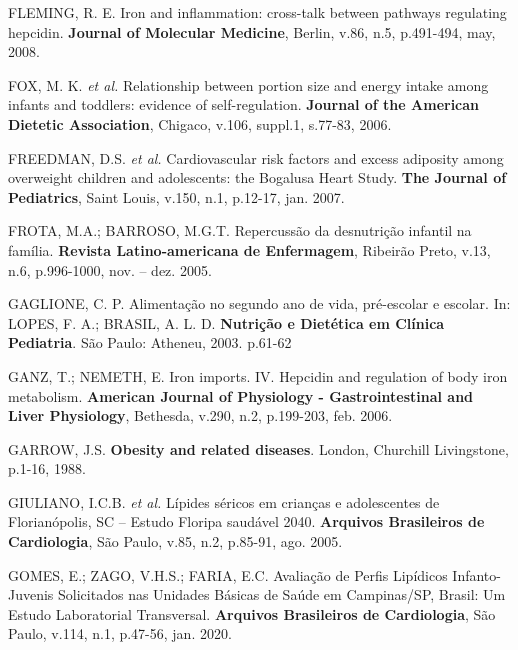 \bigbreak

\noindent FLEMING, R. E. Iron and inflammation: cross-talk between pathways regulating hepcidin. \textbf{Journal of Molecular Medicine}, Berlin, v.86, n.5, p.491-494, may, 2008.

\bigbreak

\noindent FOX, M. K. \textit{et al.} Relationship between portion size and energy intake among infants and toddlers: evidence of self-regulation. \textbf{Journal of the American Dietetic Association}, Chigaco, v.106, suppl.1, s.77-83, 2006.

\bigbreak

\noindent FREEDMAN, D.S. \textit{et al.} Cardiovascular risk factors and excess adiposity among overweight children and adolescents: the Bogalusa Heart Study. \textbf{The Journal of Pediatrics}, Saint Louis, v.150, n.1, p.12-17, jan. 2007.

\bigbreak

\noindent FROTA, M.A.; BARROSO, M.G.T. Repercussão da desnutrição infantil na família. \textbf{Revista Latino-americana de Enfermagem}, Ribeirão Preto, v.13, n.6, p.996-1000, nov. – dez. 2005.

\bigbreak

\noindent GAGLIONE, C. P. Alimentação no segundo ano de vida, pré-escolar e escolar. In: LOPES, F. A.; BRASIL, A. L. D. \textbf{Nutrição e Dietética em Clínica Pediatria}. São Paulo: Atheneu, 2003. p.61-62 

\bigbreak

\noindent GANZ, T.; NEMETH, E. Iron imports. IV. Hepcidin and regulation of body iron metabolism. \textbf{American Journal of Physiology - Gastrointestinal and Liver Physiology}, Bethesda, v.290, n.2, p.199-203, feb. 2006.

\bigbreak

\noindent GARROW, J.S. \textbf{Obesity and related diseases}. London, Churchill Livingstone, p.1-16, 1988. 

\bigbreak

\noindent GIULIANO, I.C.B. \textit{et al.} Lípides séricos em crianças e adolescentes de Florianópolis, SC – Estudo Floripa saudável 2040. \textbf{Arquivos Brasileiros de Cardiologia}, São Paulo, v.85, n.2, p.85-91, ago. 2005.

\bigbreak

\noindent GOMES, E.; ZAGO, V.H.S.; FARIA, E.C. Avaliação de Perfis Lipídicos Infanto-Juvenis Solicitados nas Unidades Básicas de Saúde em Campinas/SP, Brasil: Um Estudo Laboratorial Transversal. \textbf{Arquivos Brasileiros de Cardiologia}, São Paulo, v.114, n.1, p.47-56, jan. 2020.

